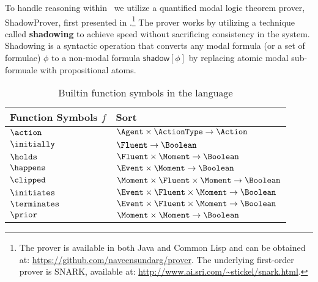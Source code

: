 
To handle reasoning within \CEC\, we utilize a quantified modal logic
theorem prover, \textsf{ShadowProver}, first presented in
\cite{nsg_sb_dde_ijcai,uncertaintyized_cognitive_calculus}.\footnote{The
  prover is available in both Java and Common Lisp and can be obtained
  at: \url{https://github.com/naveensundarg/prover}. The underlying
  first-order prover is SNARK, available at:
  \url{http://www.ai.sri.com/~stickel/snark.html}.}  The prover works
by utilizing a technique called \textbf{shadowing} to achieve speed
without sacrificing consistency in the system.  Shadowing is a
syntactic operation that converts any modal formula (or a set of
formulae) $\phi$ to a non-modal formula $\mathsf{shadow}[\phi]$ by replacing atomic
modal sub-formuale with propositional atoms.

\begin{table}
\begin{footnotesize}
\begin{center}
\begin{tabular}{lp{10.3cm}}
\toprule
\textbf{Function Symbols} $f$& \textbf{Sort}  \\
\midrule
$\action$ & $\Agent \times \ActionType \rightarrow \Action$\\
$ \initially$ & $\Fluent \rightarrow \Boolean$\\
  $\holds$ & $ \Fluent \times \Moment \rightarrow \Boolean $\\
  $ \happens$ & $ \Event \times \Moment \rightarrow \Boolean$ \\
  $ \clipped$ & $ \Moment \times \Fluent \times \Moment \rightarrow \Boolean$ \\
  $ \initiates$ & $ \Event \times \Fluent \times \Moment \rightarrow \Boolean$\\
  $ \terminates$ & $ \Event \times \Fluent \times \Moment \rightarrow \Boolean$ \\
  $ \prior$ & $\Moment \times \Moment \rightarrow \Boolean$\\
\bottomrule
\end{tabular}
\caption{Builtin function symbols in the language}
\label{syn:defs}
\end{center}
\end{footnotesize}
\end{table}


